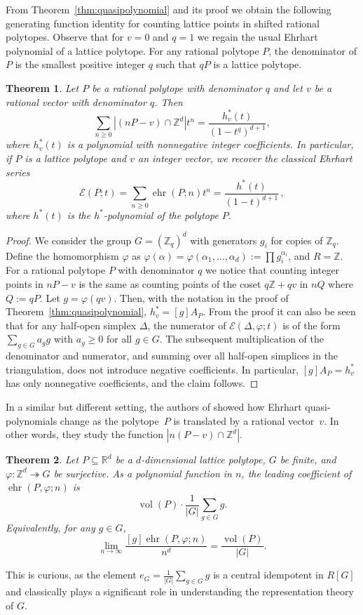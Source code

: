 \documentclass[12pt,reqno]{amsart}
\newtheorem{thm}{Theorem}[section]
\theoremstyle{definition}
\theoremstyle{remark}
\DeclareMathOperator{\vol}{vol}
\newcommand{\R}{\mathbb{R}}
\newcommand{\Z}{\mathbb{Z}}
\renewcommand{\phi}{\varphi}
\DeclareMathOperator{\ehr}{ehr}
\begin{document}
From Theorem~\ref{thm:quasipolynomial} and its proof we obtain the following generating function identity for counting lattice points in shifted rational polytopes. Observe that for $v=0$ and $q=1$ we regain the usual Ehrhart polynomial of a lattice polytope.
For any rational polytope $P$, the denominator of $P$ is the smallest positive integer $q$ such that $qP$ is a lattice polytope.



\begin{thm}
    \label{prop:translation}
Let $P$ be a rational polytope with denominator $q$ and let $v$ be a rational vector with denominator $q$. Then
$$\sum_{n\geq 0}|(nP-v)\cap \Z^d|t^n=\frac{h_v^*(t)}{(1-t^q)^{d+1}},$$
where $h_v^*(t)$ is a polynomial with nonnegative integer coefficients. In particular, if $P$ is a lattice polytope and $v$ an integer vector, we recover the classical Ehrhart series
$$\mathcal E(P;t) = \sum_{n\geq 0}\ehr(P;n)t^n=\frac{h^*(t)}{(1-t)^{d+1}} \, ,$$
where $h^*(t)$ is the $h^*$-polynomial of the polytope $P$.
\end{thm}

\begin{proof}
    We consider the group $G=(\Z_q)^d$ with generators $g_i$ for copies of $\Z_q$. Define the homomorphism $\phi$ as $\phi(\alpha)=\phi(\alpha_1,\ldots,\alpha_d):=\prod g_i^{\alpha_i}$, and $R=\Z$. For a rational polytope $P$ with denominator $q$ we notice that counting integer points in $nP-v$ is the same as counting points of the coset $q\Z +qv$ in $nQ$ where $Q:=qP$. Let $g=\varphi (qv)$. Then, with the notation in the proof of Theorem~\ref{thm:quasipolynomial}, $h^\ast _v=[g]A_P$. From the proof it can also be seen that for any half-open simplex $\Delta$, the numerator of $\mathcal{E}(\Delta,\varphi;t)$ is of the form $\sum_{g\in G} a _g g$ with $a_g\geq 0$ for all $g\in G$. The subsequent multiplication of the denominator and numerator, and summing over all half-open simplices in the triangulation, does not introduce negative coefficients. In particular, $[g]A_P=h^\ast _v$ has only nonnegative coefficients, and the claim follows. 
\end{proof}


In a similar but different setting, the authors of \cite{HMY} showed how Ehrhart quasi-polynomials change as the polytope~$P$ is translated by a rational vector~$v$.  In other words, they study the function
$|n(P-v)\cap \Z^d|$.



\begin{thm}\label{thm:volume}
Let $P \subseteq \R^d$ be a $d$-dimensional lattice polytope, $G$ be finite, and $\varphi:\Z^d \twoheadrightarrow G$ be surjective. As a polynomial function  in $n$, the leading coefficient of $\ehr(P,\varphi;n)$ is  \[\vol(P) \cdot \frac{1}{|G|} \sum_{g \in G} g.\] 
Equivalently, for any $g \in G$,
\[
\lim_{n \to \infty} \frac{[g]\ehr(P,\varphi;n)}{n^d}= \frac{\vol(P)}{|G|}.
\]
\end{thm}
This is curious, as the element $e_G=\frac{1}{|G|} \sum_{g \in G} g$ is a central idempotent in $R[G]$ and classically plays a significant role in understanding the representation theory of $G$.
\end{document}
